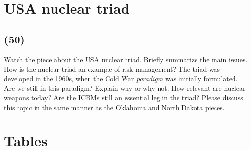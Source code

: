 \documentclass[11pt,a4paper]{article}
\makeatletter
\renewcommand\listoftables{%
    \@starttoc{lot}%
}
\makeatother
\begin{document}
\newpage

\section{USA nuclear triad}
\subsection*{(50)}
Watch the piece about the \href{http://www.pbs.org/newshour/bb/as-pentagon-overhauls-nuclear-triad-critics-advise-caution/}{USA nuclear triad}. Briefly summarize the main issues. How is the nuclear triad an example of risk management? The triad was developed in the 1960s, when the Cold War \textit{paradigm} was initially formulated. Are we still in this paradigm? Explain why or why not. How relevant are nuclear weapons today? Are the ICBMs still an essential leg in the triad? Please discuss this topic in the same manner as the Oklahoma and North Dakota pieces.





\newpage

\section*{Tables}

{%
\let\oldnumberline\numberline%
\renewcommand{\numberline}{\tablename~\oldnumberline}%
\listoftables%
}

\newpage



\newpage
\end{document}
